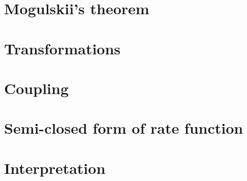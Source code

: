 

\section{Mogulskii's theorem}
\label{rate-functions:mogulskii}


\section{Transformations}
\label{rate-functions:transformations}


\section{Coupling}
\label{rate-functions:coupling}


\section{Semi-closed form of rate function}
\label{rate-functions:main}


\section{Interpretation}
\label{rate-functions:interpretation}

